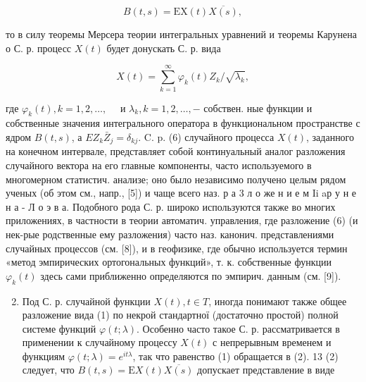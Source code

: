 \documentclass[10pt]{article}
\begin{document}
\[

B(t, s)=\mathrm{EX}(t) \overline{X(s)},

\]



то в силу теоремы Мерсера теории интегральных уравнений и теоремы Карунена о С. р. процесс $X(t)$ будет донускать С. р. вида



\[

X(t)=\sum_{k=1}^{\infty} \varphi_{k}(t) Z_{k} / \sqrt{\lambda_{k}},

\]



где $\varphi_{k}(t), k=1,2, \ldots, \quad$ и $\lambda_{k}, k=1,2, \ldots,-$ собствен. ные функции и собственные значения интегрального оператора в функциональном пространстве с ядром $B(t, s)$, а $E Z_{k} \bar{Z}_{j}=\delta_{k j}$. C. p. (6) случайного процесса $X(t)$, заданного на конечном интервале, представляет собой континуальный аналог разложения случайного вектора на его главные компоненты, часто используемого в многомерном статистич. анализе; оно было независимо получено целым рядом ученых (об этом см., напр., [5]) и чаще всего наз. р а 3 л о же н и е м Ii aр у н е н а - Л о э в а. Подобного рода С. р. широко используются также во многих приложениях, в частности в теории автоматич. управления, где разложение (6) (и нек-рые родственные ему разложения) часто наз. канонич. представлениями случайных процессов (см. [8]), и в геофизике, где обычно используется термин «метод эмпирических ортогональных функций», т. к. собственные функции $\varphi_{k}(t)$ здесь сами приближенно определяются по эмпирич. данным (см. [9]).



\begin{enumerate}

  \setcounter{enumi}{1}

  \item Под С. р. случайной функции $X(t), t \in T$, иногда понимают также общее разложение вида (1) по некрой стандартної (достаточно простой) полной системе функций $\varphi(t ; \lambda)$. Особенно часто такое С. р. рассматривается в применении к случайному процессу $X(t)$ с непрерывным временем и функциям $\varphi(t ; \lambda)=e^{i t \lambda}$, так что равенство (1) обращается в (2). 13 (2) следует, что $B(t, s)=\mathrm{E} X(t) \overline{X(s)}$ допускает представление в виде

\end{enumerate}
\end{document}
